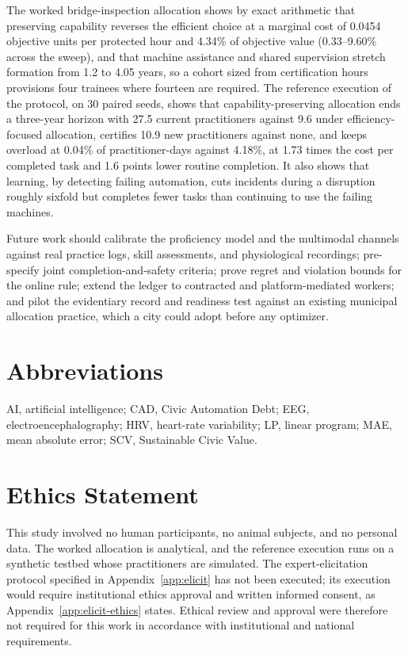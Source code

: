 \documentclass[utf8]{FrontiersinHarvard}
\begin{document}
	The worked bridge-inspection allocation shows by exact arithmetic that preserving capability reverses the efficient choice at a marginal cost of 0.0454 objective units per protected hour and 4.34\% of objective value (0.33--9.60\% across the sweep), and that machine assistance and shared supervision stretch formation from 1.2 to 4.05 years, so a cohort sized from certification hours provisions four trainees where fourteen are required. The reference execution of the protocol, on 30 paired seeds, shows that capability-preserving allocation ends a three-year horizon with 27.5 current practitioners against 9.6 under efficiency-focused allocation, certifies 10.9 new practitioners against none, and keeps overload at 0.04\% of practitioner-days against 4.18\%, at 1.73 times the cost per completed task and 1.6 points lower routine completion. It also shows that learning, by detecting failing automation, cuts incidents during a disruption roughly sixfold but completes fewer tasks than continuing to use the failing machines.

	Future work should calibrate the proficiency model and the multimodal channels against real practice logs, skill assessments, and physiological recordings; pre-specify joint completion-and-safety criteria; prove regret and violation bounds for the online rule; extend the ledger to contracted and platform-mediated workers; and pilot the evidentiary record and readiness test against an existing municipal allocation practice, which a city could adopt before any optimizer.

	\section*{Abbreviations}

	AI, artificial intelligence; CAD, Civic Automation Debt; EEG, electroencephalography; HRV, heart-rate variability; LP, linear program; MAE, mean absolute error; SCV, Sustainable Civic Value.

	\section*{Ethics Statement}

	This study involved no human participants, no animal subjects, and no personal data. The worked allocation is analytical, and the reference execution runs on a synthetic testbed whose practitioners are simulated. The expert-elicitation protocol specified in Appendix~\ref{app:elicit} has not been executed; its execution would require institutional ethics approval and written informed consent, as Appendix~\ref{app:elicit-ethics} states. Ethical review and approval were therefore not required for this work in accordance with institutional and national requirements.
\end{document}
